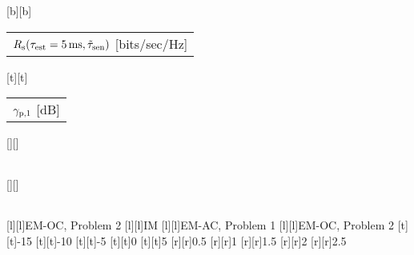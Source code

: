 %    
%
%
%
[b][b]{\fontsize{8}{12}\selectfont \color[rgb]{0,0,0}\setlength{\tabcolsep}{0pt}\begin{tabular}{c}$R_{\text{s}}(\tau_{\text{est}} = \SI{5}{ms},\tilde{\tau}_{\text{sen}})$ [bits/sec/Hz]\end{tabular}}%
[t][t]{\fontsize{8}{12}\selectfont \color[rgb]{0,0,0}\setlength{\tabcolsep}{0pt}\begin{tabular}{c}${\gamma}_{\text{p,1}}$ [dB]\end{tabular}}%
[][]{\fontsize{10}{15}\selectfont \color[rgb]{0,0,0}\setlength{\tabcolsep}{0pt}\begin{tabular}{c} \end{tabular}}%
[][]{\fontsize{10}{15}\selectfont \color[rgb]{0,0,0}\setlength{\tabcolsep}{0pt}\begin{tabular}{c} \end{tabular}}%
[l][l]{\fontsize{8}{12}\selectfont \color[rgb]{0,0,0}EM-OC, Problem 2}%
[l][l]{\fontsize{8}{12}\selectfont \color[rgb]{0,0,0}IM}%
[l][l]{\fontsize{8}{12}\selectfont \color[rgb]{0,0,0}EM-AC, Problem 1}%
[l][l]{\fontsize{8}{12}\selectfont \color[rgb]{0,0,0}EM-OC, Problem 2}%
%
\fontsize{8}{12}%
\selectfont%
%
[t][t]{-15}%
[t][t]{-10}%
[t][t]{-5}%
[t][t]{0}%
[t][t]{5}%
%
[r][r]{0.5}%
[r][r]{1}%
[r][r]{1.5}%
[r][r]{2}%
[r][r]{2.5}%
%
%
